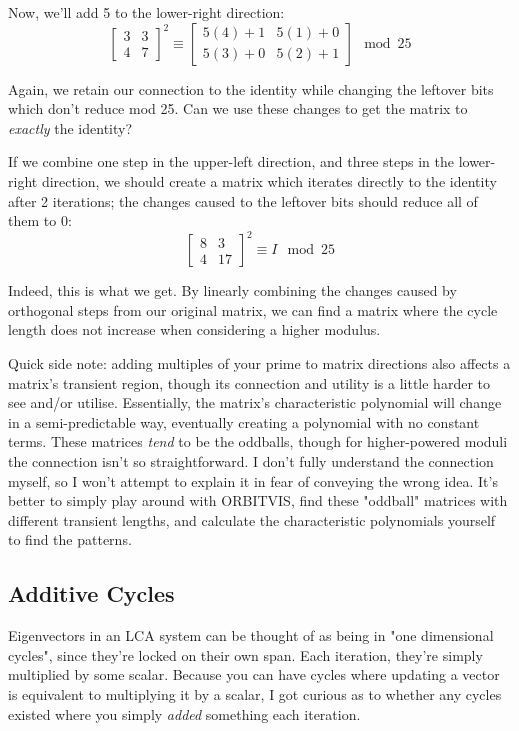 \documentclass[a4paper, 12pt, reqno]{amsart}
\newcommand{\ssubsection}[1]{\vspace{0.25cm}\subsection{#1}}
\begin{document}
			Now, we'll add 5 to the lower-right direction:
			\[
				\begin{bmatrix}
					3 & 3 \\
					4 & 7
				\end{bmatrix}^2 \equiv
				\begin{bmatrix}
					5(4) + 1 & 5(1) + 0 \\
					5(3) + 0 & 5(2) + 1
				\end{bmatrix} \mod{25}
			\]
			
			Again, we retain our connection to the identity while changing the leftover bits which don't reduce
			mod 25. Can we use these changes to get the matrix to \emph{exactly} the identity?
			
			If we combine one step in the upper-left direction, and three steps in the lower-right direction, we should
			create a matrix which iterates directly to the identity after 2 iterations; the changes caused to the leftover
			bits should reduce all of them to 0:
			\[
				\begin{bmatrix}
					8 & 3 \\
					4 & 17
				\end{bmatrix}^2 \equiv I \mod{25}
			\]
			
			Indeed, this is what we get. By linearly combining the changes caused by orthogonal steps from our original
			matrix, we can find a matrix where the cycle length does not increase when considering a higher modulus.
			
			Quick side note: adding multiples of your prime to matrix directions also affects a matrix's transient region,
			though its connection and utility is a little harder to see and/or utilise. Essentially, the matrix's
			characteristic polynomial will change in a semi-predictable way, eventually creating a polynomial with
			no constant terms. These matrices \emph{tend} to be the oddballs, though for higher-powered moduli the
			connection isn't so straightforward. I don't fully understand the connection myself, so I won't attempt to
			explain it in fear of conveying the wrong idea. It's better to simply play around with ORBITVIS, find these
			"oddball" matrices with different transient lengths, and calculate the characteristic polynomials yourself
			to find the patterns.
			
		\ssubsection{Additive Cycles} %
			Eigenvectors in an LCA system can be thought of as being in "one dimensional cycles", since they're locked on
			their own span. Each iteration, they're simply multiplied by some scalar. Because you can have cycles where
			updating a vector is equivalent to multiplying it by a scalar, I got curious as to whether any cycles existed
			where you simply \emph{added} something each iteration. 
			
\end{document}
